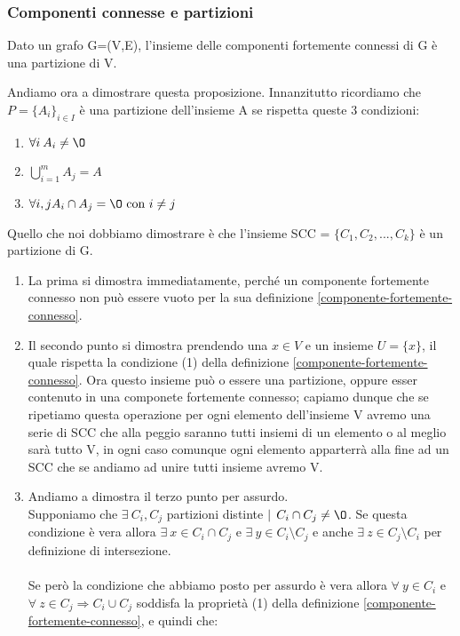 \subsubsection{Componenti connesse e partizioni}
\begin{proposition}
    Dato un grafo G=(V,E), l'insieme delle componenti fortemente connessi di G è una partizione di V.
\end{proposition}
\begin{demostration}
Andiamo ora a dimostrare questa proposizione. Innanzitutto ricordiamo che $P = \{A_i\}_{i \in I}$ è una partizione dell'insieme A se rispetta queste 3 condizioni:
\begin{enumerate}
    \item $\forall i \: A_i \neq \O$
    \item $\bigcup^m_{i=1}A_j = A$
    \item $\forall i, j A_i \cap A_j = \O\text{ con } i \neq j$
\end{enumerate}
Quello che noi dobbiamo dimostrare è che l'insieme SCC = $\{C_1, C_2, ..., C_k\}$ è un partizione di G.
\begin{enumerate}
    \item La prima si dimostra immediatamente, perché un componente fortemente connesso non può essere vuoto per la sua definizione \ref{componente-fortemente-connesso}.
    \item Il secondo punto si dimostra prendendo una $x \in V$ e un insieme $U = \{x\}$, il quale rispetta la condizione (1) della definizione \ref{componente-fortemente-connesso}. Ora questo insieme può o essere una partizione, oppure esser contenuto in una componete fortemente connesso; capiamo dunque che se ripetiamo questa operazione per ogni elemento dell'insieme V avremo una serie di SCC che alla peggio saranno tutti insiemi di un elemento o al meglio sarà tutto V, in ogni caso comunque ogni elemento apparterrà alla fine ad un SCC che se andiamo ad unire tutti insieme avremo V.
    \item Andiamo a dimostra il terzo punto per assurdo.\\ 
    Supponiamo che $\exists \: C_i, C_j$ partizioni distinte $| \: \: C_i \cap C_j \neq \O$. Se questa condizione è vera allora $\exists \: x \in C_i \cap C_j$ e $\exists \: y \in C_i \setminus C_j$ e anche $\exists \: z \in C_j \setminus C_i$ per definizione di intersezione.\\\\
    Se però la condizione che abbiamo posto per assurdo è vera allora $\forall \: y \in C_i$ e $\forall \: z \in C_j \Longrightarrow C_i \cup C_j$ soddisfa la proprietà (1) della definizione \ref{componente-fortemente-connesso}, e quindi che:\\

\end{enumerate}
\end{demostration}
